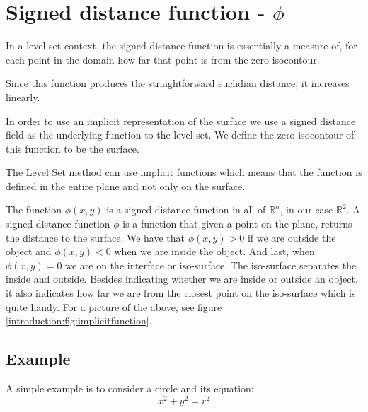 
\section*{Signed distance function - $\phi$}
In a level set context, the signed distance function is essentially a
measure of, for each point in the domain how far that point is from
the zero isocontour.

Since this function produces the straightforward euclidian distance,
it increases linearly. 

In order to use an implicit representation of the surface we use a
signed distance field as the underlying function to the level set. We
define the zero isocontour of this function to be the surface.

The Level Set method can use implicit functions which means that the
function is defined in the entire plane and not only on the surface.

The function $\phi(x,y)$ is a signed distance function in all of
$\mathbb{R}^{n}$, in our case $\mathbb{R}^{2}$. A signed distance
function $\phi$ is a function that given a point on the plane, returns
the distance to the surface. We have that $\phi(x,y) > 0$ if we are
outside the object and $\phi(x,y) < 0$ when we are inside the object.
And last, when $\phi(x,y) = 0$ we are on the interface or iso-surface.
The iso-surface separates the inside and outside.  Besides indicating
whether we are inside or outside an object, it also indicates how far
we are from the closest point on the iso-surface which is quite
handy. For a picture of the above, see figure
\vref{introduction:fig:implicitfunction}.



\subsection*{Example}

A simple example is to consider a circle and its equation:
\begin{equation*} 
  x^{2} + y^{2} = r^{2}
\end{equation*}

